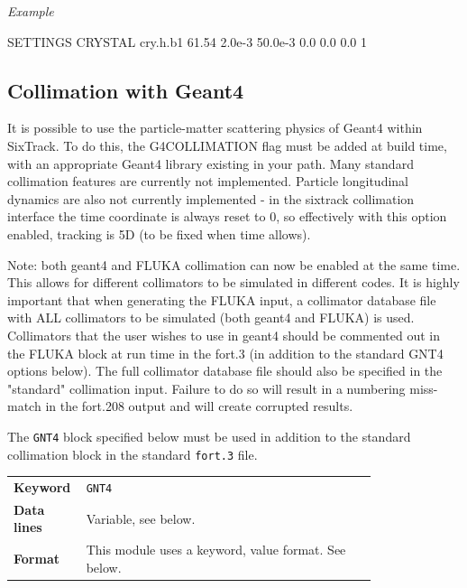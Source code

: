 \bigskip
\noindent\textit{Example}
\begin{cverbatim}
SETTINGS
CRYSTAL  cry.h.b1 61.54 2.0e-3 50.0e-3 0.0 0.0 0.0 1
\end{cverbatim}


\subsection{Collimation with Geant4}

It is possible to use the particle-matter scattering physics of Geant4 within SixTrack.
To do this, the G4COLLIMATION flag must be added at build time, with an appropriate Geant4 library existing in your path.
Many standard collimation features are currently not implemented.
Particle longitudinal dynamics are also not currently implemented - in the sixtrack collimation interface the time coordinate is always reset to 0, so effectively with this option enabled, tracking is 5D (to be fixed when time allows).

Note: both geant4 and FLUKA collimation can now be enabled at the same time.
This allows for different collimators to be simulated in different codes.
It is highly important that when generating the FLUKA input, a collimator database file with ALL collimators to be simulated (both geant4 and FLUKA) is used.
Collimators that the user wishes to use in geant4 should be commented out in the FLUKA block at run time in the fort.3 (in addition to the standard GNT4 options below).
The full collimator database file should also be specified in the "standard" collimation input.
Failure to do so will result in a numbering miss-match in the fort.208 output and will create corrupted results.

The \texttt{GNT4} block specified below must be used in addition to the standard collimation block in the standard \texttt{fort.3} file.  

\bigskip
\begin{tabular}{@{}lp{0.8\linewidth}}
    \textbf{Keyword}    & \texttt{GNT4}\index{GNT4} \\
    \textbf{Data lines} & Variable, see below. \\
    \textbf{Format}     & This module uses a keyword, value format. See below.
\end{tabular}

\bigskip

